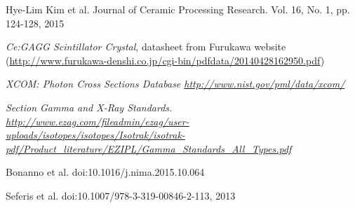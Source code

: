 \documentclass[10pt,a4paper, openany]{book}
\begin{document}
\clearpage
{}
\begin{thebibliography}{20}

Hye-Lim Kim et al. Journal of Ceramic Processing Research. Vol. 16, No. 1, pp. 124-128, 2015

\emph{Ce:GAGG Scintillator Crystal}, datasheet from Furukawa website (\url{http://www.furukawa-denshi.co.jp/cgi-bin/pdfdata/20140428162950.pdf})

\emph{XCOM: Photon Cross Sections Database \url{http://www.nist.gov/pml/data/xcom/}}

\emph{Section Gamma and X-Ray Standards. \url{http://www.ezag.com/fileadmin/ezag/user-uploads/isotopes/isotopes/Isotrak/isotrak-pdf/Product_literature/EZIPL/Gamma_Standards_All_Types.pdf}}

Bonanno et al. doi:10.1016/j.nima.2015.10.064

Seferis et al. doi:10.1007/978-3-319-00846-2-113, 2013


\end{thebibliography}
\end{document}
